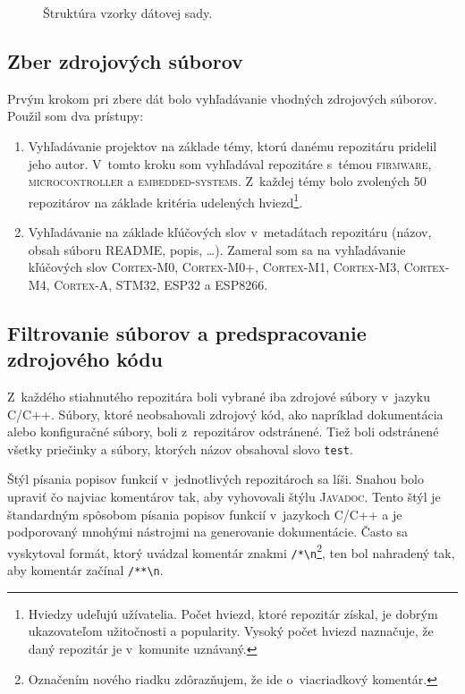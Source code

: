 \begin{figure}[!ht]
    \centering
    
    \caption{Štruktúra vzorky dátovej sady.}
    \label{fig:data-example}
\end{figure}

\newpage

\subsection*{Zber zdrojových súborov}

Prvým krokom pri zbere dát bolo vyhľadávanie vhodných zdrojových súborov. Použil som dva prístupy:
\begin{enumerate}
    \item Vyhľadávanie projektov na základe témy, ktorú danému repozitáru pridelil jeho autor. V~tomto kroku som vyhľadával repozitáre s~témou \textsc{firmware}, \textsc{microcontroller} a \textsc{embedded-systems}. Z~každej témy bolo zvolených 50 repozitárov na základe kritéria udelených hviezd\footnote{Hviedzy udeľujú užívatelia. Počet hviezd, ktoré repozitár získal, je dobrým ukazovateľom užitočnosti a popularity. Vysoký počet hviezd naznačuje, že daný repozitár je v~komunite uznávaný.}.
    \item Vyhľadávanie na základe kľúčových slov v~metadátach repozitáru (názov, obsah súboru README, popis, \dots). Zameral som sa na vyhľadávanie kľúčových slov \textsc{Cortex-M0, Cortex-M0+, Cortex-M1, Cortex-M3, Cortex-M4, Cortex-A, STM32, ESP32} a \textsc{ESP8266}.
\end{enumerate}

\subsection*{Filtrovanie súborov a predspracovanie zdrojového kódu}

Z~každého stiahnutého repozitára boli vybrané iba zdrojové súbory v~jazyku C/C++. Súbory, ktoré neobsahovali zdrojový kód, ako napríklad dokumentácia alebo konfiguračné súbory, boli z~repozitárov odstránené. Tiež boli odstránené všetky priečinky a súbory, ktorých názov obsahoval slovo \texttt{test}.

Štýl písania popisov funkcií v~jednotlivých repozitároch sa líši. Snahou bolo upraviť čo najviac komentárov tak, aby vyhovovali štýlu \textsc{Javadoc}. Tento štýl je štandardným spôsobom písania popisov funkcií v~jazykoch C/C++ a je podporovaný mnohými nástrojmi na generovanie dokumentácie. Často sa vyskytoval formát, ktorý uvádzal komentár znakmi \verb|/*\n|\footnote{Označením nového riadku zdôrazňujem, že ide o~viacriadkový komentár.}, ten bol nahradený tak, aby komentár začínal \verb|/**\n|.

